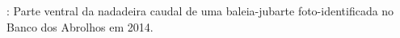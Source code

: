\label{fig:baleia2}: Parte ventral da nadadeira caudal de uma baleia-jubarte foto-identificada  no Banco dos Abrolhos em 2014.